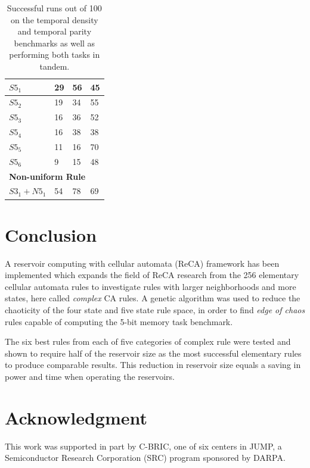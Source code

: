 \documentclass{elsarticle}
\begin{document}
\begin{multicols}{2}
\begin{table}[H]
\begin{tabular}{|l|l|l|l|}
\hline
$S5_{1}$ & 29 & 56 & 45 \\ \hline
$S5_{2}$ & 19 & 34 & 55 \\ \hline
$S5_{3}$ & 16 & 36 & 52 \\ \hline
$S5_{4}$ & 16 & 38 & 38 \\ \hline
$S5_{5}$ & 11 & 16 & 70 \\ \hline
$S5_{6}$ & 9 & 15 & 48 \\ \hline
\multicolumn{4}{|l|}{\textbf{Non-uniform Rule}} \\ \hline
$S3_1 +  N5_1$ & 54 & 78 & 69 \\ \hline
\end{tabular}
\caption{Successful runs out of 100 on the temporal density and temporal parity 
   benchmarks as well as performing both tasks in tandem.
}
\label{table:results_temp_dens}
\end{table}

\section{Conclusion}\label{conclusion}
A reservoir computing with cellular automata (ReCA) framework has been 
implemented which expands the field of ReCA research from the 256 elementary 
cellular automata rules to investigate rules with larger neighborhoods and more 
states, here called \textit{complex} CA rules. A genetic algorithm was used to 
reduce the chaoticity of the four state and five state rule space, in order to 
find \textit{edge of chaos} rules capable of computing the 5-bit memory task 
benchmark. \par The six best rules from each of five categories of complex rule 
were tested and shown to require half of the reservoir size as the most 
successful elementary rules to produce comparable results. This reduction in 
reservoir size equals a saving in power and time when operating the reservoirs.  


\section{Acknowledgment}
This work was supported in part by C-BRIC, one of six centers in JUMP, a 
Semiconductor Research Corporation (SRC) program sponsored by DARPA.




\end{multicols}
\end{document}

